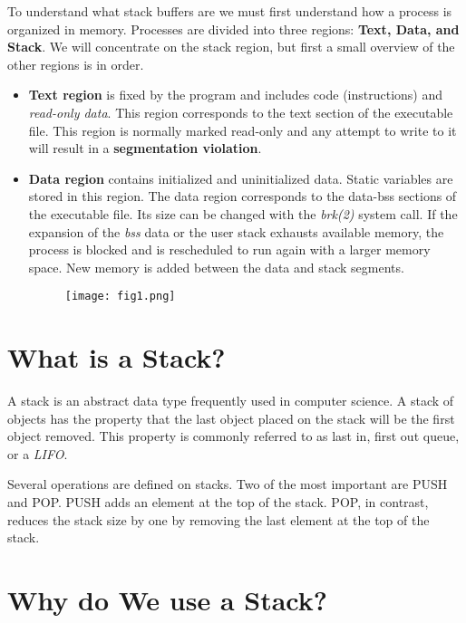 \documentclass[a4paper]{article}
\begin{document}
To understand what stack buffers are we must first understand how a process is organized in memory. Processes are divided into three regions:\textbf{ Text, Data, and Stack}. We will concentrate on the stack region, but first a small overview of the other regions is in order.

\begin{itemize}
\item \textbf{Text region} is fixed by the program and includes code (instructions) and \textit{read-only data}. This region corresponds to the text section of the executable file. This region is normally marked read-only and any attempt to write to it will result in a \textbf{segmentation violation}.

\item \textbf{Data region} contains initialized and uninitialized data. Static variables are stored in this region. The data region corresponds to the data-bss sections of the executable file. Its size can be changed with the \textit{brk(2)} system call. If the expansion of the \textit{bss} data or the user stack exhausts available memory, the process is blocked and is rescheduled to run again with a larger memory space. New memory is added between the data and stack segments.


\begin{figure}
\centering
\texttt{[image: fig1.png]}
\end{figure}
\end{itemize}

\section{What is a Stack?}

A stack is an abstract data type frequently used in computer science. A stack of objects has the property that the last object placed on the stack will be the first object removed. This property is commonly referred to as last in, first out queue, or a \textit{LIFO}.

Several operations are defined on stacks. Two of the most important are PUSH and POP. PUSH adds an element at the top of the stack. POP, in contrast, reduces the stack size by one by removing the last element at the top of the stack.

\section{Why do We use a Stack?}
\end{document}
